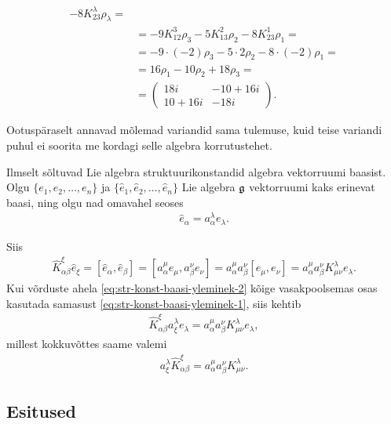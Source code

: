 \begin{naide}
\begin{align*}
           -8 K_{23}^{\lambda} \rho_\lambda = \\
        &= -9 K_{12}^{3} \rho_3
           -5 K_{13}^{2} \rho_2
           -8 K_{23}^{1} \rho_1 = \\
        &= -9 \cdot (-2) \rho_3
           -5 \cdot 2 \rho_2
           -8 \cdot (-2) \rho_1 = \\
        &= 16 \rho_1 - 10 \rho_2 + 18 \rho_3 = \\[0.1cm]
        &= \begin{pmatrix}
               18i & -10+16i \\
            10+16i &    -18i
        \end{pmatrix}.
    \end{align*}

    Ootuspäraselt annavad mõlemad variandid sama tulemuse, kuid teise
    variandi puhul ei soorita me kordagi selle algebra korrutustehet.
\end{naide}

Ilmselt sõltuvad Lie algebra struktuurikonstandid algebra vektorruumi
baasist. Olgu $\{ e_1, e_2, \dots, e_n \}$ ja
$\{ \hat{e}_1, \hat{e}_2, \dots, \hat{e}_n \}$ Lie algebra $\mathfrak{g}$
vektorruumi kaks erinevat baasi, ning olgu nad omavahel seoses
\begin{align}\label{eq:str-konst-baasi-yleminek-1}
    \hat{e}_\alpha = a_\alpha^\lambda e_\lambda.
\end{align}

Siis
\begin{align}\label{eq:str-konst-baasi-yleminek-2}
    \hat{K}_{\alpha \beta}^{\xi} \hat{e}_\xi = 
    [\hat{e}_\alpha, \hat{e}_\beta] =
    [a_\alpha^\mu e_\mu, a_\beta^\nu e_\nu] =
    a_\alpha^\mu a_\beta^\nu [e_\mu, e_\nu] =
    a_\alpha^\mu a_\beta^\nu K_{\mu \nu}^{\lambda} e_\lambda.
\end{align}
Kui võrduste ahela \eqref{eq:str-konst-baasi-yleminek-2} kõige
vasakpoolsemas osas kasutada samasust
\eqref{eq:str-konst-baasi-yleminek-1}, siis kehtib
\begin{align*}
    \hat{K}_{\alpha \beta}^{\xi} a_\xi^\lambda e_\lambda =
    a_\alpha^\mu a_\beta^\nu K_{\mu \nu}^{\lambda} e_\lambda,
\end{align*}
millest kokkuvõttes saame valemi
\begin{align*}
    a_\xi^\lambda \hat{K}_{\alpha \beta}^{\xi} =
    a_\alpha^\mu a_\beta^\nu K_{\mu \nu}^{\lambda}.
\end{align*}

\subsection{Esitused}

